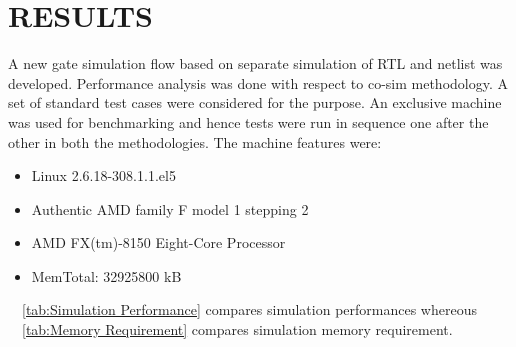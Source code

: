 \chapter{RESULTS}
\label{chap:results.tex}
A new gate simulation flow based on separate simulation of RTL and netlist was developed. Performance analysis was done with respect to co-sim methodology. A set of standard test cases were considered for the purpose. An exclusive machine was used for benchmarking and hence tests were run in sequence one after the other in both the methodologies. The machine features were:
\begin{itemize}
\item Linux 2.6.18-308.1.1.el5
\item Authentic AMD family F model 1 stepping 2
\item AMD FX(tm)-8150 Eight-Core Processor
\item MemTotal:     32925800 kB
\end{itemize}  

~\tablename{~\ref{tab:Simulation Performance}} compares simulation performances whereous ~\tablename{~\ref{tab:Memory Requirement}} compares simulation memory requirement.


\newpage
